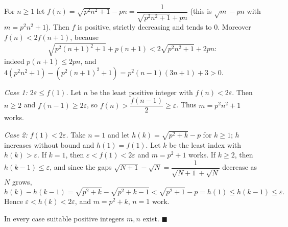 For $n\ge1$ let $f(n)=\sqrt{p^2n^2+1}-pn=\dfrac{1}{\sqrt{p^2n^2+1}+pn}$ (this is $\sqrt m-pn$ with $m=p^2n^2+1$). Then $f$ is positive, strictly decreasing and tends to $0$. Moreover $f(n)<2f(n+1)$, because
\[\sqrt{p^2(n+1)^2+1}+p(n+1)<2\sqrt{p^2n^2+1}+2pn:\]
indeed $p(n+1)\le2pn$, and $4(p^2n^2+1)-\left(p^2(n+1)^2+1\right)=p^2(n-1)(3n+1)+3>0$.

\emph{Case 1: $2\varepsilon\le f(1)$.} Let $n$ be the least positive integer with $f(n)<2\varepsilon$. Then $n\ge2$ and $f(n-1)\ge2\varepsilon$, so $f(n)>\dfrac{f(n-1)}{2}\ge\varepsilon$. Thus $m=p^2n^2+1$ works.

\emph{Case 2: $f(1)<2\varepsilon$.} Take $n=1$ and let $h(k)=\sqrt{p^2+k}-p$ for $k\ge1$; $h$ increases without bound and $h(1)=f(1)$. Let $k$ be the least index with $h(k)>\varepsilon$. If $k=1$, then $\varepsilon<f(1)<2\varepsilon$ and $m=p^2+1$ works. If $k\ge2$, then $h(k-1)\le\varepsilon$, and since the gaps $\sqrt{N+1}-\sqrt N=\dfrac{1}{\sqrt{N+1}+\sqrt N}$ decrease as $N$ grows,
\[h(k)-h(k-1)=\sqrt{p^2+k}-\sqrt{p^2+k-1}<\sqrt{p^2+1}-p=h(1)\le h(k-1)\le\varepsilon.\]
Hence $\varepsilon<h(k)<2\varepsilon$, and $m=p^2+k$, $n=1$ work.

In every case suitable positive integers $m,n$ exist. $\blacksquare$

